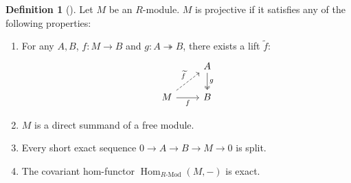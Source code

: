 \documentclass[11pt]{article}
\newcommand{\Hom}{\operatorname{Hom}}
\theoremstyle{plain}
\theoremstyle{definition}
\newtheorem{definition}{Definition}[section]
\begin{document}
  \begin{definition}[\cite{nlab:projective_module}]\label{def:projective}
  Let \(M\) be an \(R\)-module. \(M\) is projective if it satisfies any of the following properties:

  \begin{enumerate}
  \item\label{projective-lifting} For any \(A, B\), \(f : M \to B\) and \(g : A \twoheadrightarrow B\), there exists a lift \(\widetilde{f}\):
    \[
      \begin{tikzcd}
        & A \arrow[two heads]{d}{g}\\
        M \arrow[dashed]{ur}{\widetilde{f}}\arrow[swap]{r}{f}& B
      \end{tikzcd}
    \]
  \item \label{projective-free-summand} \(M\) is a direct summand of a free module.

    \item \label{projective-split} Every short exact sequence \(0 \to A \to B \to M \to 0\) is split.

    \item \label{projective-hom-exact} The covariant hom-functor \(\Hom_{R\text{-Mod}}(M, -)\) is exact.
  \end{enumerate}
\end{definition}
\end{document}
